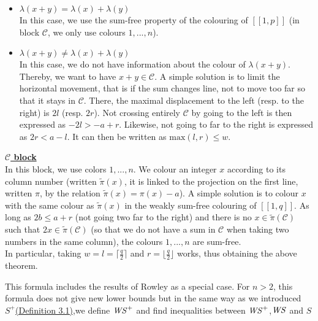 \begin{itemize}
	\item \underline{\(\lambda(x+y) = \lambda(x) + \lambda(y)\)} \\
	In this case, we use the sum-free property of the colouring of \([\![1,p]\!]\) (in block \(\mathcal{C}\), we only use colours \(1, ..., n\)).

	\item \underline{\(\lambda(x+y) \neq \lambda(x) + \lambda(y)\)} \\
	In this case, we do not have information about the colour of \(\lambda(x+y)\). Thereby, we want to have \(x+y \in \mathcal{C}\).
	A simple solution is to limit the horizontal movement, that is if the sum changes line, not to move too far so that it stays in \(\mathcal{C}\).
	There, the maximal displacement to the left (resp. to the right) is \(2l\) (resp. \(2r\)). Not crossing entirely \(\mathcal{C}\) by going to the left
	is then expressed as \(-2l > -a + r\). Likewise, not going to far to the right is expressed as \(2r < a - l\). It can then be written as
	 \(\text{max}(l, r) \leqslant w\).
\end{itemize}

\underline{\textbf{\(\mathcal{C}\) block}} \\
In this block,  we use colors \(1, ..., n\). We colour an integer \(x\) according to its column number (written \(\tilde{\pi}(x)\), it is linked to the
projection on the first line, written \(\pi\), by the relation \(\tilde{\pi}(x) = \pi(x) - a\)). A simple solution is to colour \(x\) with the same colour
as \(\tilde{\pi}(x)\) in the weakly sum-free colouring of \([\![1,q]\!]\). As long as \(2b \leqslant a + r\) (not going two far to the right) and there
is no \(x \in \tilde{\pi}(\mathcal{C})\) such that \(2x \in \tilde{\pi}(\mathcal{C})\) (so that we do not have a sum in \(\mathcal{C}\) when
taking two numbers in the same column), the colours \(1, ..., n\) are sum-free. \\

In particular, taking \(w = l = \lceil \frac{q}{2} \rceil\) and \(r = \lfloor \frac{q}{2} \rfloor\) works, thus obtaining the above theorem. \\

\begin{remark}
This formula includes the results of Rowley \cite{RowleyWS} as a special case. For \(n>2\),
this formula does not give new lower bounds but in the same way as we introduced \(S^+\)\hyperref[SE]{(Definition
3.1)},we define \(\mathit{WS}^+\) and find inequalities between \(\mathit{WS}^+\),\(\mathit{WS}\) and \(S\)
\end{remark}

